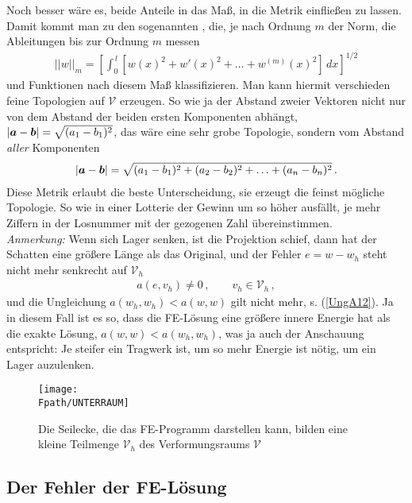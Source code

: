 Noch besser w\"{a}re es, beide Anteile in das Ma{\ss}, in die Metrik einflie{\ss}en zu lassen. Damit kommt man zu den sogenannten , die, je nach Ordnung $m$ der Norm, die Ableitungen bis zur Ordnung $m$ messen
\begin{align}
 ||w||_m = \left[\int_0^{\,l} \left [w(x)^2 + w'(x)^2 +
\ldots + w^{(m)}(x)^2 \right]\, dx \right]^{1/2}
\end{align}
und Funktionen nach diesem Ma{\ss} klassifizieren. Man kann hiermit verschieden feine Topologien auf $\mathcal{V}$ erzeugen. So wie ja der Abstand zweier Vektoren nicht nur von dem Abstand der beiden ersten Komponenten abh\"{a}ngt, $|\mbox{\boldmath $a$} - \mbox{\boldmath $b$}| = \sqrt{(a_1- b_1)^2}$, das w\"{a}re eine sehr grobe Topologie, sondern vom Abstand {\em aller\/} Komponenten
\begin{align}
|\mbox{\boldmath $a$} - \mbox{\boldmath $b$}| = \sqrt{(a_1- b_1)^2 + (a_2- b_2)^2 + \ldots + (a_n- b_n)^2 }\,.
\end{align}
Diese Metrik erlaubt die beste Unterscheidung, sie erzeugt die feinst m\"{o}gliche Topologie. So wie in einer Lotterie der Gewinn um so h\"{o}her ausf\"{a}llt, je mehr Ziffern in der Losnummer mit der gezogenen Zahl \"{u}bereinstimmen.\\

{\em Anmerkung:\/} Wenn sich Lager senken, ist  die Projektion \glq schief\grq,  dann hat der Schatten eine gr\"{o}{\ss}ere L\"{a}nge als das Original, und der Fehler $e = w - w_h$ steht nicht mehr senkrecht auf $\mathcal{V}_h$
\begin{align}
a(e,v_h) \neq 0\,,  \qquad v_h \in \mathcal{V}_h\,,
\end{align}
und die Ungleichung  $a(w_h,w_h) < a(w,w)$ gilt nicht mehr, s. (\ref{UngA12}). Ja in diesem Fall ist es so, dass die FE-L\"{o}sung eine gr\"{o}{\ss}ere innere Energie hat als die exakte L\"{o}sung, $a(w,w) < a(w_h,w_h)$, was ja auch der Anschauung entspricht: Je steifer ein Tragwerk ist, um so mehr Energie ist n\"{o}tig, um ein Lager auzulenken.
\begin{figure}[tbp] \centering
\if {} \sidecaption \fi
\texttt{[image: \\Fpath/UNTERRAUM]}
\caption{Die Seilecke, die das FE-Programm darstellen kann, bilden eine kleine Teilmenge $\mathcal{V}_{h}$
des Verformungsraums $\mathcal{V}$}
\label{Unterraum}
\end{figure}%
{\textcolor{sectionTitleBlue}{\section{Der Fehler der FE-L\"{o}sung}}}\label{Der Fehler der FE-Loesung}

